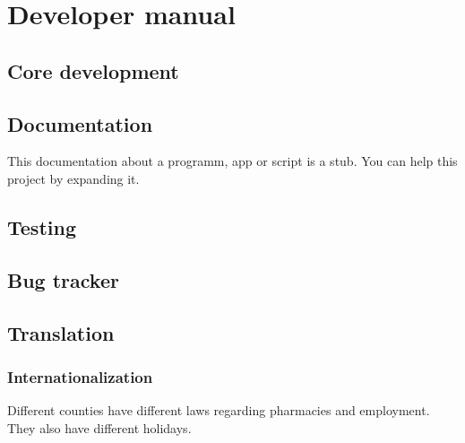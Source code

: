 \documentclass[12pt,a4paper,titlepage]{report}
\begin{document}
\chapter{Developer manual}
\section{Core development}
\section{Documentation}
This documentation about a programm, app or script is a stub. You can help this project by expanding it.

\section{Testing}
\section{Bug tracker}
\section{Translation}
\subsection{Internationalization}
Different counties have different laws regarding pharmacies and employment. They also have different holidays.
\end{document}
